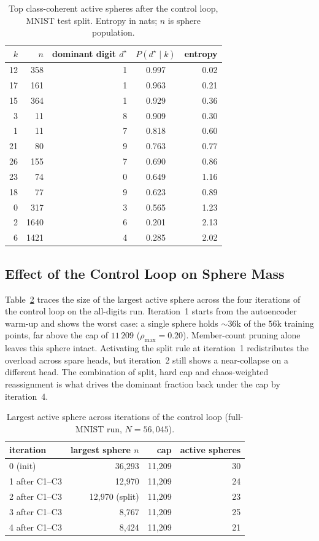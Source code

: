 \documentclass[conference]{IEEEtran}
\begin{document}
\begin{table}[t]
\centering
\caption{Top class-coherent active spheres after the control loop, MNIST test split. Entropy in nats; \(n\) is sphere population.}
\label{tab:topclusters}
\begin{tabular}{rrrcr}
\toprule
\(k\) & \(n\) & dominant digit \(d^{\star}\) & \(P(d^{\star}\mid k)\) & entropy \\
\midrule
12 & 358  & 1 & 0.997 & 0.02 \\
17 & 161  & 1 & 0.963 & 0.21 \\
15 & 364  & 1 & 0.929 & 0.36 \\
3  & 11   & 8 & 0.909 & 0.30 \\
1  & 11   & 7 & 0.818 & 0.60 \\
21 & 80   & 9 & 0.763 & 0.77 \\
26 & 155  & 7 & 0.690 & 0.86 \\
23 & 74   & 0 & 0.649 & 1.16 \\
18 & 77   & 9 & 0.623 & 0.89 \\
0  & 317  & 3 & 0.565 & 1.23 \\
\midrule
2  & 1640 & 6 & 0.201 & 2.13 \\
6  & 1421 & 4 & 0.285 & 2.02 \\
\bottomrule
\end{tabular}
\end{table}

\subsection{Effect of the Control Loop on Sphere Mass}
\label{sec:massflow}
Table~\ref{tab:massflow} traces the size of the largest active sphere across the four iterations of the control loop on the all-digits run. Iteration~1 starts from the autoencoder warm-up and shows the worst case: a single sphere holds \(\sim\!36\)k of the \(56\)k training points, far above the cap of \(11\,209\) (\(\rho_{\max}=0.20\)). Member-count pruning alone leaves this sphere intact. Activating the split rule at iteration~1 redistributes the overload across spare heads, but iteration~2 still shows a near-collapse on a different head. The combination of split, hard cap and chaos-weighted reassignment is what drives the dominant fraction back under the cap by iteration~4.

\begin{table}[t]
\centering
\caption{Largest active sphere across iterations of the control loop (full-MNIST run, \(N=56{,}045\)).}
\label{tab:massflow}
\begin{tabular}{lrrr}
\toprule
iteration & largest sphere \(n\) & cap & active spheres \\
\midrule
0 (init)     & 36{,}293 & 11{,}209 & 30 \\
1 after C1--C3 & 12{,}970 & 11{,}209 & 24 \\
2 after C1--C3 & 12{,}970 (split) & 11{,}209 & 23 \\
3 after C1--C3 & 8{,}767  & 11{,}209 & 25 \\
4 after C1--C3 & 8{,}424  & 11{,}209 & 21 \\
\bottomrule
\end{tabular}
\end{table}
\end{document}
